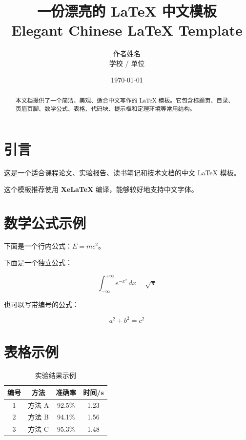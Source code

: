 \documentclass[12pt,a4paper]{ctexart}
\title{
    \vspace{2cm}
    \Huge \textbf{\color{mainblue}一份漂亮的 \LaTeX{} 中文模板} \\[0.5em]
    \Large Elegant Chinese LaTeX Template
}
\author{
    作者姓名 \\[0.3em]
    \small 学校 / 单位
}
\date{\today}
\begin{document}
\maketitle
\thispagestyle{empty}

\vspace{2cm}

\begin{abstract}
本文档提供了一个简洁、美观、适合中文写作的 \LaTeX{} 模板。它包含标题页、目录、页眉页脚、数学公式、表格、代码块、提示框和定理环境等常用结构。
\end{abstract}

\newpage
\tableofcontents
\newpage

\section{引言}

这是一个适合课程论文、实验报告、读书笔记和技术文档的中文 \LaTeX{} 模板。

\begin{notebox}
这个模板推荐使用 \textbf{XeLaTeX} 编译，能够较好地支持中文字体。
\end{notebox}

\section{数学公式示例}

下面是一个行内公式：$E = mc^2$。

下面是一个独立公式：

\[
    \int_{-\infty}^{+\infty} e^{-x^2} \, dx = \sqrt{\pi}
\]

也可以写带编号的公式：

\begin{equation}
    a^2 + b^2 = c^2
\end{equation}

\section{表格示例}

\begin{table}[htbp]
\centering
\caption{实验结果示例}
\begin{tabular}{cccc}
\toprule
编号 & 方法 & 准确率 & 时间/s \\
\midrule
1 & 方法 A & 92.5\% & 1.23 \\
2 & 方法 B & 94.1\% & 1.56 \\
3 & 方法 C & 95.3\% & 1.48 \\
\bottomrule
\end{tabular}
\end{table}
\end{document}
